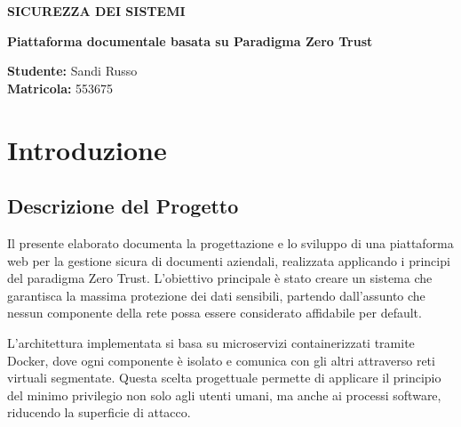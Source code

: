 \documentclass[12pt, a4paper]{article}
\begin{document}
\begin{titlepage}
    \centering
    \vspace*{1cm}
    
    \Huge
    \textbf{SICUREZZA DEI SISTEMI}
    
    \vspace{1.5cm}
    
    \LARGE
    \textbf{Piattaforma documentale basata su Paradigma Zero Trust}
    
    \vspace{0.8cm}
    
    \Large
    \vspace{2cm}
    
    \large
    \textbf{Studente:} Sandi Russo \\
    \textbf{Matricola:} 553675
    
    \vspace{2.5cm}
    
\end{titlepage}

\newpage
\tableofcontents
\newpage

\section{Introduzione}

\subsection{Descrizione del Progetto}

Il presente elaborato documenta la progettazione e lo sviluppo di una piattaforma web per la gestione sicura di documenti aziendali, realizzata applicando i principi del paradigma Zero Trust. L'obiettivo principale è stato creare un sistema che garantisca la massima protezione dei dati sensibili, partendo dall'assunto che nessun componente della rete possa essere considerato affidabile per default.

L'architettura implementata si basa su microservizi containerizzati tramite Docker, dove ogni componente è isolato e comunica con gli altri attraverso reti virtuali segmentate. Questa scelta progettuale permette di applicare il principio del minimo privilegio non solo agli utenti umani, ma anche ai processi software, riducendo la superficie di attacco.
\end{document}
